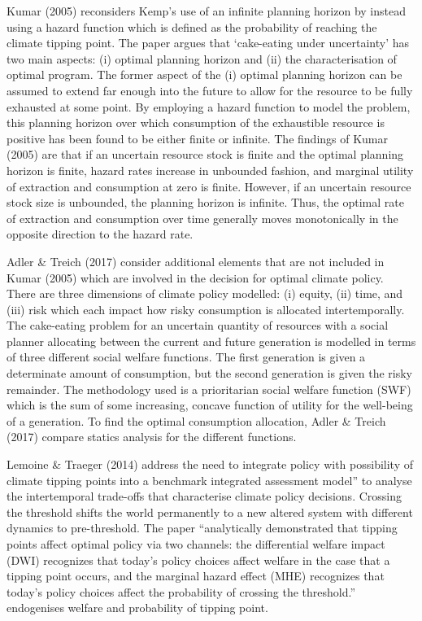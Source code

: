 \documentclass[11pt,preprint, authoryear]{elsarticle}
\numberwithin{equation}{section}
\numberwithin{figure}{section}
\numberwithin{table}{section}
\begin{document}
Kumar (2005) reconsiders Kemp's use of an infinite planning horizon by
instead using a hazard function which is defined as the probability of
reaching the climate tipping point. The paper argues that `cake-eating
under uncertainty' has two main aspects: (i) optimal planning horizon
and (ii) the characterisation of optimal program. The former aspect of
the (i) optimal planning horizon can be assumed to extend far enough
into the future to allow for the resource to be fully exhausted at some
point. By employing a hazard function to model the problem, this
planning horizon over which consumption of the exhaustible resource is
positive has been found to be either finite or infinite. The findings of
Kumar (2005) are that if an uncertain resource stock is finite and the
optimal planning horizon is finite, hazard rates increase in unbounded
fashion, and marginal utility of extraction and consumption at zero is
finite. However, if an uncertain resource stock size is unbounded, the
planning horizon is infinite. Thus, the optimal rate of extraction and
consumption over time generally moves monotonically in the opposite
direction to the hazard rate.

Adler \& Treich (2017) consider additional elements that are not
included in Kumar (2005) which are involved in the decision for optimal
climate policy. There are three dimensions of climate policy modelled:
(i) equity, (ii) time, and (iii) risk which each impact how risky
consumption is allocated intertemporally. The cake-eating problem for an
uncertain quantity of resources with a social planner allocating between
the current and future generation is modelled in terms of three
different social welfare functions. The first generation is given a
determinate amount of consumption, but the second generation is given
the risky remainder. The methodology used is a prioritarian social
welfare function (SWF) which is the sum of some increasing, concave
function of utility for the well-being of a generation. To find the
optimal consumption allocation, Adler \& Treich (2017) compare statics
analysis for the different functions.

Lemoine \& Traeger (2014) address the need to integrate policy with
possibility of climate tipping points into a benchmark integrated
assessment model'' to analyse the intertemporal trade-offs that
characterise climate policy decisions. Crossing the threshold shifts the
world permanently to a new altered system with different dynamics to
pre-threshold. The paper ``analytically demonstrated that tipping points
affect optimal policy via two channels: the differential welfare impact
(DWI) recognizes that today's policy choices affect welfare in the case
that a tipping point occurs, and the marginal hazard effect (MHE)
recognizes that today's policy choices affect the probability of
crossing the threshold.'' endogenises welfare and probability of tipping
point.
\end{document}
